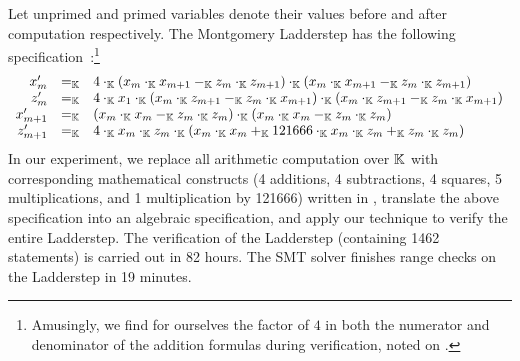Let unprimed and primed variables denote their values before and after
computation respectively.
The Montgomery Ladderstep has the following
specification~\cite{M:87:SPEC}:\footnote{Amusingly, we find for
  ourselves the factor of $4$ in both the numerator and denominator of
  the addition formulas during verification, noted on
  \cite[p.~261]{M:87:SPEC}.}
\[
\begin{array}{rcl}
  x'_{m} & =_{\mathbb{K}} & 4 \cdot_{\mathbb{K}} (x_m \cdot_{\mathbb{K}} x_{m+1} -_{\mathbb{K}} z_m \cdot_{\mathbb{K}} z_{m+1})
               \cdot_{\mathbb{K}} (x_m \cdot_{\mathbb{K}} x_{m+1} -_{\mathbb{K}} z_m \cdot_{\mathbb{K}} z_{m+1}) \\
  z'_{m} & =_{\mathbb{K}} & 4 \cdot_{\mathbb{K}} x_1 \cdot_{\mathbb{K}} (x_m \cdot_{\mathbb{K}} z_{m+1} -_{\mathbb{K}}
               z_m \cdot_{\mathbb{K}} x_{m+1})
               \cdot_{\mathbb{K}} (x_m \cdot_{\mathbb{K}} z_{m+1} -_{\mathbb{K}} z_m \cdot_{\mathbb{K}} x_{m+1}) \\
  x'_{m+1} & =_{\mathbb{K}} & (x_m \cdot_{\mathbb{K}} x_m -_{\mathbb{K}} z_m \cdot_{\mathbb{K}} z_m) \cdot_{\mathbb{K}}
                 (x_m \cdot_{\mathbb{K}} x_m -_{\mathbb{K}} z_m \cdot_{\mathbb{K}} z_m) \\
  z'_{m+1} & =_{\mathbb{K}} & 4 \cdot_{\mathbb{K}} x_m \cdot_{\mathbb{K}} z_m \cdot_{\mathbb{K}}
                 (x_m \cdot_{\mathbb{K}} x_m +_{\mathbb{K}} 121666 \cdot_{\mathbb{K}} x_m \cdot_{\mathbb{K}} z_m +_{\mathbb{K}}
                 z_m \cdot_{\mathbb{K}} z_m)
\end{array}
\]
In our experiment, we replace all arithmetic computation over $\mathbb{K}$
with corresponding mathematical constructs (4 additions, 4 subtractions, 4 squares, 5
multiplications, and 1 multiplication by 121666) written in \mydsl,
translate the above specification into an algebraic specification, and
apply our technique to verify the entire Ladderstep.
The verification of the Ladderstep (containing 1462 statements) is carried out in 82 hours.
The SMT solver finishes range checks on the Ladderstep in 19 minutes.



%
% 
%

